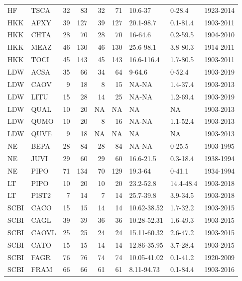 \documentclass[
]{article}
\begin{document}
\begin{table}[!h]
{\begin{tabular}{llrrrrlll}
\addlinespace
HF & TSCA & 32 & 83 & 32 & 71 & 10.6-37 & 0-28.4 & 1923-2014\\
\addlinespace
HKK & AFXY & 39 & 127 & 39 & 127 & 20.1-98.7 & 0.1-81.4 & 1903-2011\\
\addlinespace
HKK & CHTA & 28 & 70 & 28 & 70 & 16-64.6 & 0.2-59.5 & 1904-2010\\
\addlinespace
HKK & MEAZ & 46 & 130 & 46 & 130 & 25.6-98.1 & 3.8-80.3 & 1914-2011\\
\addlinespace
HKK & TOCI & 45 & 143 & 45 & 143 & 16.6-116.4 & 1.7-80.5 & 1903-2011\\
\addlinespace
LDW & ACSA & 35 & 66 & 34 & 64 & 9-64.6 & 0-52.4 & 1903-2019\\
\addlinespace
LDW & CAOV & 9 & 18 & 8 & 15 & NA-NA & 1.4-37.4 & 1903-2013\\
\addlinespace
LDW & LITU & 15 & 28 & 14 & 25 & NA-NA & 1.2-69.4 & 1903-2019\\
\addlinespace
LDW & QUAL & 10 & 20 & NA & NA & NA & NA & 1903-2013\\
\addlinespace
LDW & QUMO & 10 & 20 & 8 & 16 & NA-NA & 1.1-52.4 & 1903-2013\\
\addlinespace
LDW & QUVE & 9 & 18 & NA & NA & NA & NA & 1903-2013\\
\addlinespace
NE & BEPA & 28 & 84 & 28 & 84 & NA-NA & 0-25.5 & 1903-1995\\
\addlinespace
NE & JUVI & 29 & 60 & 29 & 60 & 16.6-21.5 & 0.3-18.4 & 1938-1994\\
\addlinespace
NE & PIPO & 71 & 134 & 70 & 129 & 19.3-64 & 0-41.1 & 1934-1994\\
\addlinespace
LT & PIPO & 10 & 20 & 10 & 20 & 23.2-52.8 & 14.4-48.4 & 1903-2018\\
\addlinespace
LT & PIST2 & 7 & 14 & 7 & 14 & 25.7-39.8 & 3.9-34.5 & 1903-2018\\
\addlinespace
SCBI & CACO & 15 & 15 & 14 & 14 & 10.62-38.52 & 1.7-32.2 & 1903-2015\\
\addlinespace
SCBI & CAGL & 39 & 39 & 36 & 36 & 10.28-52.31 & 1.6-49.3 & 1903-2015\\
\addlinespace
SCBI & CAOVL & 25 & 25 & 24 & 24 & 15.11-60.32 & 2.6-47.2 & 1903-2015\\
\addlinespace
SCBI & CATO & 15 & 15 & 14 & 14 & 12.86-35.95 & 3.7-28.4 & 1903-2015\\
\addlinespace
SCBI & FAGR & 76 & 76 & 74 & 74 & 10.05-41.02 & 0.1-41.2 & 1920-2009\\
\addlinespace
SCBI & FRAM & 66 & 66 & 61 & 61 & 8.11-94.73 & 0.1-84.4 & 1903-2016\\

\end{tabular}}
\end{table}
\end{document}
